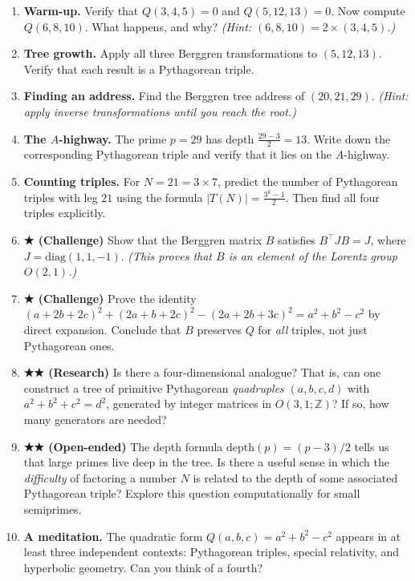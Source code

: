 \begin{enumerate}
\def\labelenumi{\arabic{enumi}.}
\item
  \textbf{Warm-up.} Verify that \(Q(3, 4, 5) = 0\) and \(Q(5, 12, 13) = 0\). Now compute \(Q(6, 8, 10)\). What happens, and why? \emph{(Hint: \((6, 8, 10) = 2 \times (3, 4, 5)\).)}
\item
  \textbf{Tree growth.} Apply all three Berggren transformations to \((5, 12, 13)\). Verify that each result is a Pythagorean triple.
\item
  \textbf{Finding an address.} Find the Berggren tree address of \((20, 21, 29)\). \emph{(Hint: apply inverse transformations until you reach the root.)}
\item
  \textbf{The \(A\)-highway.} The prime \(p = 29\) has depth \(\frac{29 - 3}{2} = 13\). Write down the corresponding Pythagorean triple and verify that it lies on the \(A\)-highway.
\item
  \textbf{Counting triples.} For \(N = 21 = 3 \times 7\), predict the number of Pythagorean triples with leg \(21\) using the formula \(|T(N)| = \frac{3^k - 1}{2}\). Then find all four triples explicitly.
\item
  \textbf{★ (Challenge)} Show that the Berggren matrix \(B\) satisfies \(B^\top J B = J\), where \(J = \text{diag}(1, 1, -1)\). \emph{(This proves that \(B\) is an element of the Lorentz group \(O(2,1)\).)}
\item
  \textbf{★ (Challenge)} Prove the identity \((a + 2b + 2c)^2 + (2a + b + 2c)^2 - (2a + 2b + 3c)^2 = a^2 + b^2 - c^2\) by direct expansion. Conclude that \(B\) preserves \(Q\) for \emph{all} triples, not just Pythagorean ones.
\item
  \textbf{★★ (Research)} Is there a four-dimensional analogue? That is, can one construct a tree of primitive Pythagorean \emph{quadruples} \((a, b, c, d)\) with \(a^2 + b^2 + c^2 = d^2\), generated by integer matrices in \(O(3,1; \mathbb{Z})\)? If so, how many generators are needed?
\item
  \textbf{★★ (Open-ended)} The depth formula \(\text{depth}(p) = (p-3)/2\) tells us that large primes live deep in the tree. Is there a useful sense in which the \emph{difficulty} of factoring a number \(N\) is related to the depth of some associated Pythagorean triple? Explore this question computationally for small semiprimes.
\item
  \textbf{A meditation.} The quadratic form \(Q(a, b, c) = a^2 + b^2 - c^2\) appears in at least three independent contexts: Pythagorean triples, special relativity, and hyperbolic geometry. Can you think of a fourth?
\end{enumerate}
